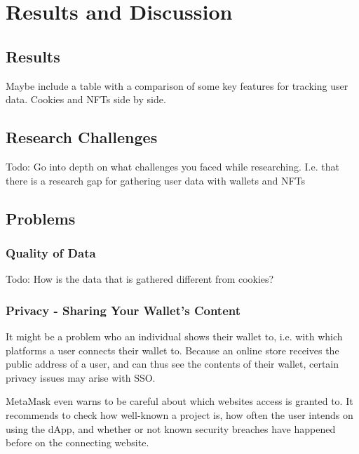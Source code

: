 \chapter{Results and Discussion}
\label{ch:results}


%
%
\section{Results}
\label{sec:results:results}
Maybe include a table with a comparison of some key features for tracking user data. Cookies and NFTs side by side.


%
%
\section{Research Challenges}
\label{sec:results:researchChallenges}
Todo: Go into depth on what challenges you faced while researching. I.e. that there is a research gap for gathering user data with wallets and NFTs

%
%
\section{Problems}
\label{sec:results:problems}

\subsection{Quality of Data}
\label{sub:results:data}
Todo: How is the data that is gathered different from cookies?



\subsection{Privacy - Sharing Your Wallet's Content}
\label{sec:results:walletContent}
It might be a problem who an individual shows their wallet to, i.e. with which platforms a user connects their wallet to. Because an online store receives the public address of a user, and can thus see the contents of their wallet, certain privacy issues may arise with SSO.

MetaMask even warns to be careful about which websites access is granted to. It recommends to check how well-known a project is, how often the user intends on using the dApp, and whether or not known security breaches have happened before on the connecting website. \cite{metaMask}

